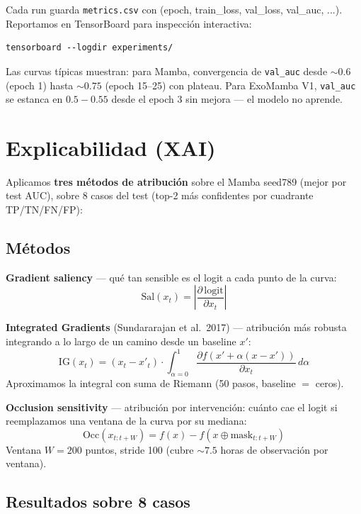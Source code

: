 \documentclass[11pt, a4paper]{article}
\begin{document}
Cada run guarda \texttt{metrics.csv} con (epoch, train\_loss, val\_loss, val\_auc, ...). Reportamos en TensorBoard para inspección interactiva:

\begin{lstlisting}[basicstyle=\ttfamily\footnotesize]
tensorboard --logdir experiments/
\end{lstlisting}

Las curvas típicas muestran: para Mamba, convergencia de \texttt{val\_auc} desde $\sim 0.6$ (epoch 1) hasta $\sim 0.75$ (epoch 15--25) con plateau. Para ExoMamba V1, \texttt{val\_auc} se estanca en $0.5\!-\!0.55$ desde el epoch 3 sin mejora --- el modelo no aprende.

\section{Explicabilidad (XAI)}

Aplicamos \textbf{tres métodos de atribución} sobre el Mamba seed789 (mejor por test AUC), sobre 8 casos del test (top-2 más confidentes por cuadrante TP/TN/FN/FP):

\subsection{Métodos}

\textbf{Gradient saliency} --- qué tan sensible es el logit a cada punto de la curva:
$$
\text{Sal}(x_t) = \left| \frac{\partial \, \text{logit}}{\partial x_t} \right|
$$

\textbf{Integrated Gradients} (Sundararajan et al.\ 2017) --- atribución más robusta integrando a lo largo de un camino desde un baseline $x'$:
$$
\text{IG}(x_t) = (x_t - x'_t) \cdot \int_{\alpha=0}^{1} \frac{\partial f\!\left(x' + \alpha(x - x')\right)}{\partial x_t} \, d\alpha
$$
Aproximamos la integral con suma de Riemann (50 pasos, baseline $=$ ceros).

\textbf{Occlusion sensitivity} --- atribución por intervención: cuánto cae el logit si reemplazamos una ventana de la curva por su mediana:
$$
\text{Occ}(x_{t:t+W}) = f(x) - f\!\left( x \oplus \text{mask}_{t:t+W} \right)
$$
Ventana $W=200$ puntos, stride 100 (cubre $\sim 7.5$ horas de observación por ventana).

\subsection{Resultados sobre 8 casos}
\end{document}
